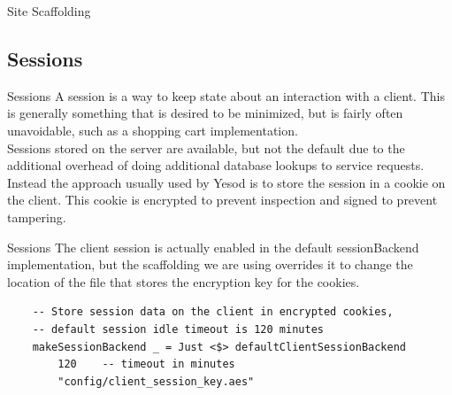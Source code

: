 \documentclass[pdf]{beamer}
\begin{document}
\begin{frame}{Site Scaffolding}
\end{frame}

\subsection{Sessions}

\begin{frame}{Sessions}
  A session is a way to keep state about an interaction with a
  client. This is generally something that is desired to be minimized,
  but is fairly often unavoidable, such as a shopping cart
  implementation. \\

  Sessions stored on the server are available, but not the default due
  to the additional overhead of doing additional database lookups to
  service requests. \\

  Instead the approach usually used by Yesod is to store the session
  in a cookie on the client. This cookie is encrypted to prevent
  inspection and signed to prevent tampering.
\end{frame}

\begin{frame}[fragile]{Sessions}
  The client session is actually enabled in the default sessionBackend
  implementation, but the scaffolding we are using overrides it to
  change the location of the file that stores the encryption key for
  the cookies. \\

  \begin{verbatim}
    -- Store session data on the client in encrypted cookies,
    -- default session idle timeout is 120 minutes
    makeSessionBackend _ = Just <$> defaultClientSessionBackend
        120    -- timeout in minutes
        "config/client_session_key.aes"
  \end{verbatim}
\end{frame}
\end{document}
